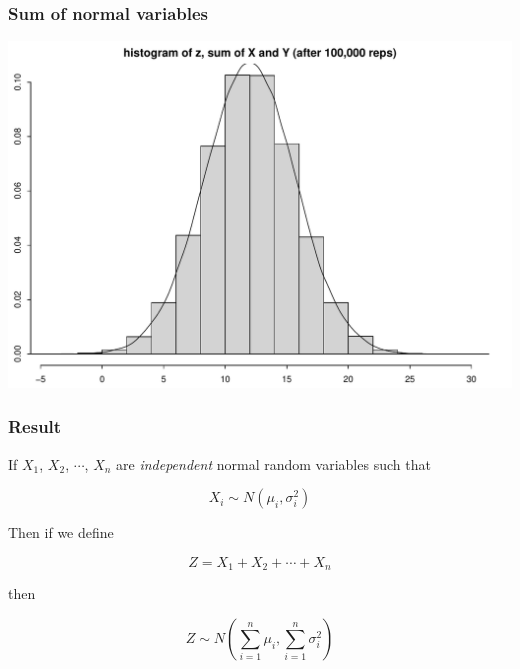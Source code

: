 \documentclass{beamer}\usepackage[]{graphicx}\usepackage[]{color}
\newenvironment{knitrout}{}{} %
\renewenvironment{knitrout}{\begin{spacing}{0.75}\begin{tiny}}{\end{tiny}\end{spacing}}
\begin{document}
\begin{frame}[fragile]

\frametitle{Sum of normal variables}

\begin{knitrout}\small
{}\color{fgcolor}

{\centering \includegraphics[width=0.99\linewidth]{figure/graphics-unnamed-chunk-12-1} 

}



\end{knitrout}

\end{frame}


\begin{frame}[fragile]

\frametitle{Result}

If $X_1$, $X_2$, $\cdots$, $X_n$ are \emph{independent} normal random variables such that 

$$ X_{i} \sim N \left (\mu_i, \sigma^2_{i} \right) $$

Then if we define 

$$ Z = X_1 + X_2 + \cdots + X_{n} $$

then 

$$  Z \sim N \left (\sum_{i=1}^{n} \mu_{i}, \sum_{i=1}^{n} \sigma^2_{i} \right ) $$

\end{frame}
\end{document}
